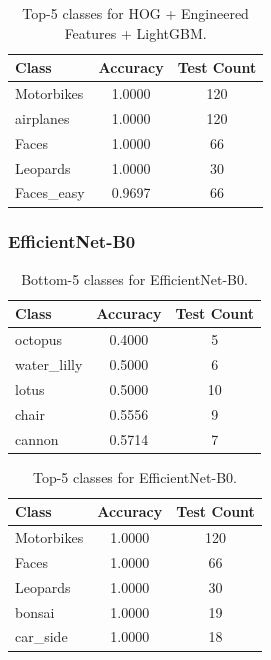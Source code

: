 \documentclass[11pt]{article}
\begin{document}
\begin{table}[H]
\centering
\caption{Top-5 classes for HOG + Engineered Features + LightGBM.}
\begin{tabular}{lcc}
\toprule
Class & Accuracy & Test Count \\
\midrule
Motorbikes & 1.0000 & 120 \\
airplanes & 1.0000 & 120 \\
Faces & 1.0000 & 66 \\
Leopards & 1.0000 & 30 \\
Faces\_easy & 0.9697 & 66 \\
\bottomrule
\end{tabular}
\end{table}

\subsubsection{EfficientNet-B0}
\begin{table}[H]
\centering
\caption{Bottom-5 classes for EfficientNet-B0.}
\begin{tabular}{lcc}
\toprule
Class & Accuracy & Test Count \\
\midrule
octopus & 0.4000 & 5 \\
water\_lilly & 0.5000 & 6 \\
lotus & 0.5000 & 10 \\
chair & 0.5556 & 9 \\
cannon & 0.5714 & 7 \\
\bottomrule
\end{tabular}
\end{table}

\begin{table}[H]
\centering
\caption{Top-5 classes for EfficientNet-B0.}
\begin{tabular}{lcc}
\toprule
Class & Accuracy & Test Count \\
\midrule
Motorbikes & 1.0000 & 120 \\
Faces & 1.0000 & 66 \\
Leopards & 1.0000 & 30 \\
bonsai & 1.0000 & 19 \\
car\_side & 1.0000 & 18 \\
\bottomrule
\end{tabular}
\end{table}
\end{document}

